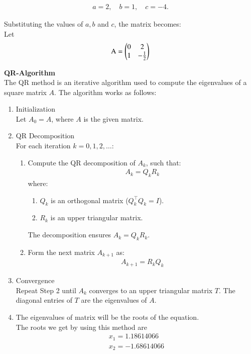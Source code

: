 \documentclass[journal]{IEEEtran}
\begin{document}
\begin{align}
a = 2, \quad b=1, \quad c = -4.
\end{align}

Substituting the values of $a,b$ and $c$, the matrix becomes:\\
Let
\begin{align}
\text{A} =
\begin{pmatrix}0 & 2 \\
1 & -\frac{1}{2}
\end{pmatrix}
\end{align}




\textbf{QR-Algorithm}\\
The QR method is an iterative algorithm used to compute the eigenvalues of a square matrix $A$. The algorithm works as follows:
\begin{enumerate}
    
\item Initialization \\
Let $A_0 = A $, where $A$ is the given matrix.

\item QR Decomposition \\
For each iteration $ k = 0, 1, 2, \dots $:
\begin{enumerate}
    \item Compute the QR decomposition of \( A_k \), such that:
    \begin{align}
    A_k = Q_k R_k
    \end{align}
    where:
    \begin{enumerate}
        \item $Q_k $ is an orthogonal matrix ($ Q_k^\top Q_k = I $).
        \item $ R_k $ is an upper triangular matrix.
    \end{enumerate}
    The decomposition ensures $ A_k = Q_k R_k $.

    \item Form the next matrix \( A_{k+1} \) as:
    \begin{align}
    A_{k+1} = R_k Q_k
    \end{align}
\end{enumerate}

\item Convergence\\
Repeat Step 2 until $ A_k $ converges to an upper triangular matrix $ T $. The diagonal entries of $T$ are the eigenvalues of $A$.\\
\item The eigenvalues of matrix will be the roots of the equation.\\
The roots we get by using this method are 
\begin{align}
    x_1=1.18614066\\
    x_2=-1.68614066
\end{align}
\end{enumerate}
\end{document}

